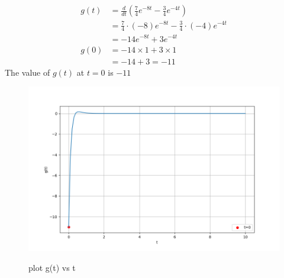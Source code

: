 \documentclass[journal,12pt,twocolumn]{IEEEtran}
\theoremstyle{remark}
\begin{document}
\begin{align}
g(t) &= \frac{d}{dt}\left(\frac{7}{4}e^{-8t} - \frac{3}{4}e^{-4t}\right) \\
&= \frac{7}{4}\cdot(-8)e^{-8t} - \frac{3}{4}\cdot(-4)e^{-4t} \\
&= -14e^{-8t} + 3e^{-4t} \\
g(0) &= -14 \times 1 + 3 \times 1 \\
&= -14 + 3 = -11
\end{align}
The value of $g(t)$ at $t = 0$ is $-11$ \\
\begin{figure}[h!]
\centering
\includegraphics[width=\columnwidth]{figs/stem_plot.png}
\label{fig:tansh_plott}
\caption{plot g(t) vs t }
\end{figure}
\end{document}
